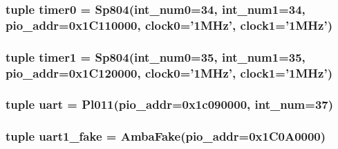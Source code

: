 \label{classRealView_1_1VExpress__EMM_a42d6450a02aa42b77cd21f39eb6a3fbb}
\hypertarget{classRealView_1_1VExpress__EMM_af4ebf9ec12f4c51e9fd2eee3647a3932}{
\subsubsection[{timer0}]{\setlength{\rightskip}{0pt plus 5cm}tuple {\bf timer0} = {\bf Sp804}(int\_\-num0=34, int\_\-num1=34, pio\_\-addr=0x1C110000, clock0='1MHz', clock1='1MHz')}}
\label{classRealView_1_1VExpress__EMM_af4ebf9ec12f4c51e9fd2eee3647a3932}
\hypertarget{classRealView_1_1VExpress__EMM_a43a269dacabf237422bf29f79e52a7e5}{
\subsubsection[{timer1}]{\setlength{\rightskip}{0pt plus 5cm}tuple {\bf timer1} = {\bf Sp804}(int\_\-num0=35, int\_\-num1=35, pio\_\-addr=0x1C120000, clock0='1MHz', clock1='1MHz')}}
\label{classRealView_1_1VExpress__EMM_a43a269dacabf237422bf29f79e52a7e5}
\hypertarget{classRealView_1_1VExpress__EMM_a1f69fbabd17d6bca63f97f9754247cfd}{
\subsubsection[{uart}]{\setlength{\rightskip}{0pt plus 5cm}tuple {\bf uart} = {\bf Pl011}(pio\_\-addr=0x1c090000, int\_\-num=37)}}
\label{classRealView_1_1VExpress__EMM_a1f69fbabd17d6bca63f97f9754247cfd}
\hypertarget{classRealView_1_1VExpress__EMM_ae8df5f47228f3c94133173ef497a4203}{
\subsubsection[{uart1\_\-fake}]{\setlength{\rightskip}{0pt plus 5cm}tuple {\bf uart1\_\-fake} = {\bf AmbaFake}(pio\_\-addr=0x1C0A0000)}}
